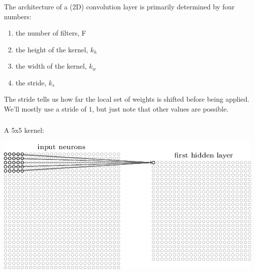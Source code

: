 \documentclass[xetex,mathserif,serif,aspectratio=169]{beamer}
\begin{document}
\begin{frame}[fragile] \frametitle{} \oldB \small

\textbf{}

The architecture of a (2D) convolution layer is primarily
determined by four numbers:
\begin{enumerate}
\item the number of filters, F
\item the height of the kernel, $k_h$
\item the width of the kernel, $k_w$
\item the stride, $k_s$
\end{enumerate}
The stride tells us how far the local set of weights is
shifted before being applied. We'll mostly use a stride
of $1$, but just note that other values are possible.

\end{frame}

\begin{frame}[fragile] \frametitle{} \oldB \small

A 5x5 kernel:

\begin{center}
\includegraphics[height=0.7\textheight]{img/tikz44.png}
\end{center}

\end{frame}
\end{document}

